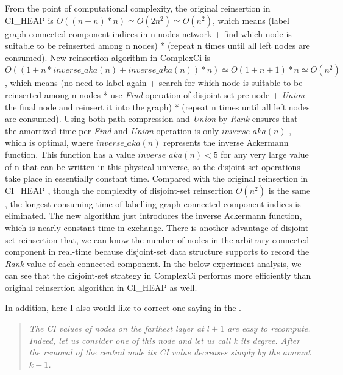 \documentclass{article}
\newenvironment{itquote}
{\begin{quote}\itshape}
	{\end{quote}\ignorespacesafterend}
\begin{document}
\begin{enumerate}
\begin{item}
		From the point of computational complexity, the original reinsertion in CI\_HEAP is $O((n+n)*n) \simeq O(2n^2) \simeq O(n^2)$, which means (label graph connected component indices in n nodes network + find which node is suitable to be reinserted among n nodes) * (repeat n times until all left nodes are consumed). New reinsertion algorithm in ComplexCi is $O((1+n*inverse\_aka(n)+inverse\_aka(n)) *n) \simeq O(1+n+1)*n \simeq O(n^2)$ , which means (no need to label again + search for which node is suitable to be reinserted among n nodes * use \textit{Find} operation of disjoint-set pre node + \textit{Union} the final node and reinsert it into the graph) * (repeat n times until all left nodes are consumed). Using both path compression and \textit{Union} by \textit{Rank} ensures that the amortized time per \textit{Find} and \textit{Union} operation is only $inverse\_aka(n)$ \cite{tarjan1979class}\cite{tarjan1984worst} , which is optimal, where $inverse\_aka(n)$ represents the inverse Ackermann function. This function has a value $inverse\_aka(n)<5$ for any very large value of n that can be written in this physical universe, so the disjoint-set operations take place in essentially constant time\cite{wikiDisjointsetdatastructure}. Compared with the original reinsertion in CI\_HEAP , though the complexity of disjoint-set reinsertion $O(n^2)$ is the same , the longest consuming time of labelling graph connected component indices is eliminated. The new algorithm just introduces the inverse Ackermann function, which is nearly constant time in exchange. There is another advantage of disjoint-set reinsertion that, we can know the number of nodes in the arbitrary connected component in real-time because disjoint-set data structure supports to record the \textit{Rank} value of each connected component. In the below experiment analysis, we can see that the disjoint-set strategy in ComplexCi performs more efficiently than original reinsertion algorithm in CI\_HEAP as well.


	\end{item}
	\end{enumerate}	

	
	In addition, here I also would like to correct one saying in the \cite{morone2016collective}. 
	
	\begin{itquote}
		The CI values of nodes on the farthest layer at $l + 1$ are easy to recompute. Indeed, let us consider one of this node and let us call k its degree. After the removal of the central node its CI value decreases simply by the amount $k − 1$.
	\end{itquote}
\end{document}
